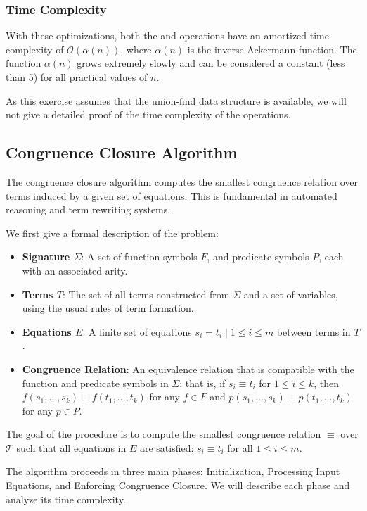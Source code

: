 \subsubsection{Time Complexity}

With these optimizations, both the \find{} and \union{} operations have an amortized
time complexity of $\mathcal{O}(\alpha(n))$, where $\alpha(n)$ is the inverse
Ackermann function. The function $\alpha(n)$ grows extremely slowly and can be
considered a constant (less than 5) for all practical values of $n$.

As this exercise assumes that the union-find data structure is available, we
will not give a detailed proof of the time complexity of the operations.

\subsection{Congruence Closure Algorithm}

The congruence closure algorithm computes the smallest congruence relation over
terms induced by a given set of equations. This is fundamental in automated
reasoning and term rewriting systems.

We first give a formal description of the problem:

\begin{itemize}
  \item \textbf{Signature $\Sigma$}: A set of function symbols $F$,
and predicate symbols $P$, each with an associated arity.
\item \textbf{Terms $T$}: The set of
all terms constructed from $\Sigma$ and a set of variables, using the usual
rules of term formation.
\item \textbf{Equations $E$}: A finite set of equations
${ s_i = t_i \mid 1 \leq i \leq m }$ between terms in $T$.
\item \textbf{Congruence Relation}: An equivalence relation that is compatible with
the function and predicate symbols in $\Sigma$; that is, if $s_i \equiv t_i$ for $1 \leq i
\leq k$, then $f(s_1, \dots, s_k) \equiv f(t_1, \dots, t_k)$ for any $f \in
F$ and $p(s_1, \dots, s_k) \equiv p(t_1, \dots, t_k)$ for any $p \in P$.
\end{itemize}

The goal of the procedure is to compute the smallest congruence relation
$\equiv$ over $\mathcal{T}$ such that all equations in $E$ are satisfied: $s_i
\equiv t_i$ for all $1 \leq i \leq m$.

The algorithm proceeds in three main phases: Initialization, Processing
Input Equations, and Enforcing Congruence Closure. We will describe each phase
and analyze its time complexity.


